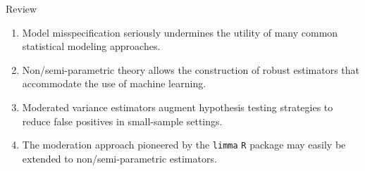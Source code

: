 \documentclass{beamer}
\begin{document}
\begin{frame}[c]{Review}
\begin{center}
\begin{enumerate}
  \itemsep6pt
  \item Model misspecification seriously undermines the utility of many common
    statistical modeling approaches.
  \item Non/semi-parametric theory allows the construction of robust estimators
    that accommodate the use of machine learning.
  \item Moderated variance estimators augment hypothesis testing strategies to
    reduce false positives in small-sample settings.
  \item The moderation approach pioneered by the \texttt{limma} \texttt{R}
    package may easily be extended to non/semi-parametric estimators.
\end{enumerate}
\end{center}


\end{frame}


\begin{frame}[c,allowframebreaks]{}

\small



\end{frame}

\end{document}
